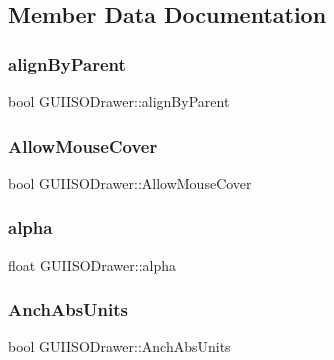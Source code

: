 \subsection{Member Data Documentation}
\hypertarget{class_g_u_i_i_s_o_drawer_ac3eeda3d542a4ab02850c6f467b5900d}{}\label{class_g_u_i_i_s_o_drawer_ac3eeda3d542a4ab02850c6f467b5900d} 
\subsubsection{\texorpdfstring{align\+By\+Parent}{alignByParent}}
{\footnotesize\ttfamily bool G\+U\+I\+I\+S\+O\+Drawer\+::align\+By\+Parent}

\hypertarget{class_g_u_i_i_s_o_drawer_a3b8ea70cb598d2efb5729f33b5f4e008}{}\label{class_g_u_i_i_s_o_drawer_a3b8ea70cb598d2efb5729f33b5f4e008} 
\subsubsection{\texorpdfstring{Allow\+Mouse\+Cover}{AllowMouseCover}}
{\footnotesize\ttfamily bool G\+U\+I\+I\+S\+O\+Drawer\+::\+Allow\+Mouse\+Cover}

\hypertarget{class_g_u_i_i_s_o_drawer_a1690c93c8843c087e8d2896569bbcafe}{}\label{class_g_u_i_i_s_o_drawer_a1690c93c8843c087e8d2896569bbcafe} 
\subsubsection{\texorpdfstring{alpha}{alpha}}
{\footnotesize\ttfamily float G\+U\+I\+I\+S\+O\+Drawer\+::alpha}

\hypertarget{class_g_u_i_i_s_o_drawer_aec65c9b0f86901bd4722541237c8ee7b}{}\label{class_g_u_i_i_s_o_drawer_aec65c9b0f86901bd4722541237c8ee7b} 
\subsubsection{\texorpdfstring{Anch\+Abs\+Units}{AnchAbsUnits}}
{\footnotesize\ttfamily bool G\+U\+I\+I\+S\+O\+Drawer\+::\+Anch\+Abs\+Units}

